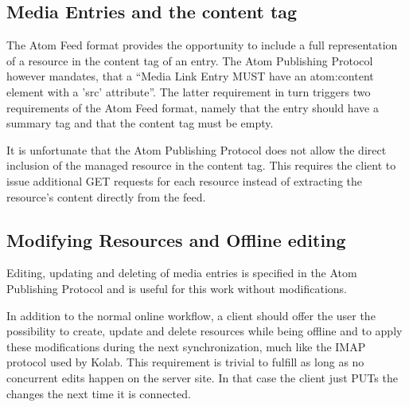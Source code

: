 \documentclass[11pt,a4paper,headsepline,twoside]{scrartcl}		%
\newcommand{\citeurl}[2]{\url{#1} (#2)}
\begin{document}
\subsection{Media Entries and the content tag}
\label{sec:inline-feeds-or}

The Atom Feed format provides the opportunity to include a full representation
of a resource in the content tag of an entry\cite[sec. 4.1.3]{RFC4287}. The Atom
Publishing Protocol however mandates, that a ``Media Link Entry MUST have an
atom:content element with a 'src' attribute''\cite[sec. 9.6]{RFC5023}. The
latter requirement in turn triggers two requirements of the Atom Feed format,
namely that the entry should have a summary tag and that the content tag must be
empty\cite[sec. 4.1.1.1,4.1.3.2]{RFC4287}.

It is unfortunate that the Atom Publishing Protocol does not allow the direct
inclusion of the managed resource in the content tag. This requires the client
to issue additional GET requests for each resource instead of extracting the
resource's content directly from the feed.

\subsection{Modifying Resources and Offline editing}

Editing, updating and deleting of media entries is specified in the Atom
Publishing Protocol and is useful for this work without modifications.


In addition to the normal online workflow, a client should offer the user the
possibility to create, update and delete resources while being offline and to
apply these modifications during the next synchronization, much like the IMAP
protocol used by Kolab. This requirement is trivial to fulfill as long as no
concurrent edits happen on the server site. In that case the client just PUTs
the changes the next time it is connected.
\end{document}
